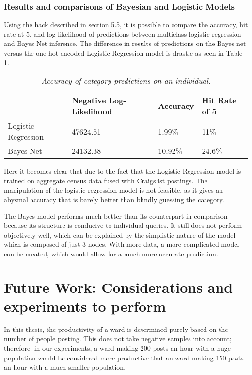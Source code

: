 \documentclass[12pt]{article}
\begin{document}
\subsubsection{Results and comparisons of Bayesian and Logistic Models}
Using the hack described in section 5.5, it is possible to compare the accuracy, hit rate at 5, and log likelihood of predictions between multiclass logistic regression and Bayes Net inference. The difference in results of predictions on the Bayes net versus the one-hot encoded Logistic Regression model is drastic as seen in Table 1. 

\begin{table}[]
\centering
\begin{tabular}{l|l|l|l|}
\cline{2-4}
 & Negative Log-Likelihood & Accuracy & Hit Rate of 5 \\ \hline
\multicolumn{1}{|l|}{Logistic Regression} & 47624.61 & 1.99\% & 11\% \\ \hline
\multicolumn{1}{|l|}{Bayes Net} & 24132.38 & 10.92\% & 24.6\% \\ \hline
\end{tabular}
\caption{\textit{Accuracy of category predictions on an individual.}}
\end{table}

Here it becomes clear that due to the fact that the Logistic Regression model is trained on aggregate census data fused with Craigslist postings. The manipulation of the logistic regression model is not feasible, as it gives an abysmal accuracy that is barely better than blindly guessing the category. 

The Bayes model performs much better than its counterpart in comparison because its structure is conducive to individual queries. It still does not perform objectively well, which can be explained by the simplistic nature of the model which is composed of just 3 nodes. With more data, a more complicated model can be created, which would allow for a much more accurate prediction. 

\newpage
\section{Future Work: Considerations and experiments to perform}
In this thesis, the productivity of a ward is determined purely based on the number of people posting. This does not take negative samples into account; therefore, in our experiments, a ward making 200 posts an hour with a huge population would be considered more productive that an ward making 150 posts an hour with a much smaller population. 
\end{document}
